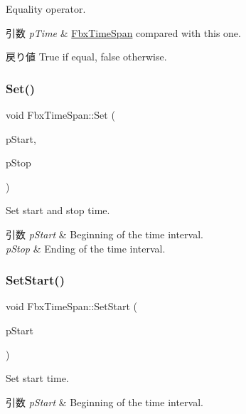 Equality operator. 
\begin{DoxyParams}{引数}
{\em p\+Time} & \hyperlink{class_fbx_time_span}{Fbx\+Time\+Span} compared with this one. \\
\hline
\end{DoxyParams}
\begin{DoxyReturn}{戻り値}
{\ttfamily True} if equal, {\ttfamily false} otherwise. 
\end{DoxyReturn}
\mbox{\label{class_fbx_time_span_a29861241ccf52ec9c3f491d336209ff7}} 
\subsubsection{\texorpdfstring{Set()}{Set()}}
{\footnotesize\ttfamily void Fbx\+Time\+Span\+::\+Set (\begin{DoxyParamCaption}\item[{\hyperlink{class_fbx_time}{Fbx\+Time}}]{p\+Start,  }\item[{\hyperlink{class_fbx_time}{Fbx\+Time}}]{p\+Stop }\end{DoxyParamCaption})}

Set start and stop time. 
\begin{DoxyParams}{引数}
{\em p\+Start} & Beginning of the time interval. \\
\hline
{\em p\+Stop} & Ending of the time interval. \\
\hline
\end{DoxyParams}
\mbox{\label{class_fbx_time_span_a453592f02b54bc27d664386c1d37abda}} 
\subsubsection{\texorpdfstring{Set\+Start()}{SetStart()}}
{\footnotesize\ttfamily void Fbx\+Time\+Span\+::\+Set\+Start (\begin{DoxyParamCaption}\item[{\hyperlink{class_fbx_time}{Fbx\+Time}}]{p\+Start }\end{DoxyParamCaption})}

Set start time. 
\begin{DoxyParams}{引数}
{\em p\+Start} & Beginning of the time interval. \\
\hline
\end{DoxyParams}
\mbox{\label{class_fbx_time_span_a7b0577b88300d141657ed2092228c867}} 
